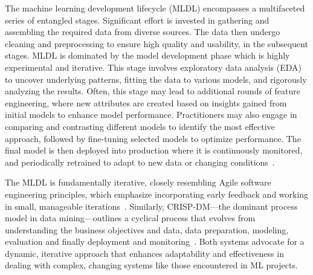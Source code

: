 The machine learning development lifecycle (MLDL) encompasses a multifaceted series of entangled stages. Significant effort is invested in gathering and assembling the required data from diverse sources. The data then undergo cleaning and preprocessing to ensure high quality and usability, in the subsequent stages. MLDL is dominated by the model development phase which is highly experimental and iterative. This stage involves exploratory data analysis (EDA) to uncover underlying patterns, fitting the data to various models, and rigorously analyzing the results. Often, this stage may lead to additional rounds of feature engineering, where new attributes are created based on insights gained from initial models to enhance model performance. Practitioners may also engage in comparing and contrasting different models to identify the most effective approach, followed by fine-tuning selected models to optimize performance. The final model is then deployed into production where it is continuously monitored, and periodically retrained to adapt to new data or changing conditions~\cite{haakman2021ai,amershi2019software,sculley2015hidden}.


The MLDL is fundamentally iterative, closely resembling Agile software engineering principles, which emphasize incorporating early feedback and working in small, manageable iterations~\cite{betz2018managing}. Similarly, CRISP-DM---the dominant process model in data mining---outlines a cyclical process that evolves from understanding the business objectives and data, data preparation, modeling, evaluation and finally deployment and monitoring~\cite{martinez-plumed2021crisp-dm}. Both systems advocate for a dynamic, iterative approach that enhances adaptability and effectiveness in dealing with complex, changing systems like those encountered in ML projects.

